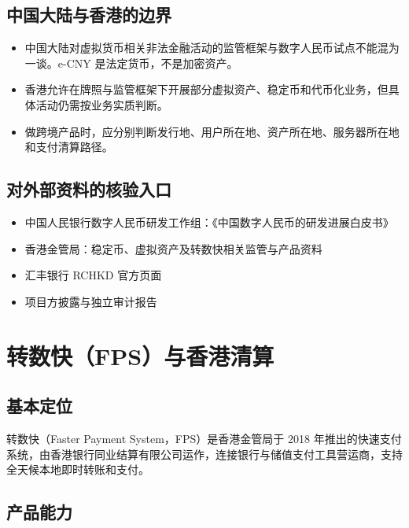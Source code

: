 \section{中国大陆与香港的边界}\label{ux4e2dux56fdux5927ux9646ux4e0eux9999ux6e2fux7684ux8fb9ux754c}

\begin{itemize}
\tightlist
\item
  中国大陆对虚拟货币相关非法金融活动的监管框架与数字人民币试点不能混为一谈。e-CNY
  是法定货币，不是加密资产。
\item
  香港允许在牌照与监管框架下开展部分虚拟资产、稳定币和代币化业务，但具体活动仍需按业务实质判断。
\item
  做跨境产品时，应分别判断发行地、用户所在地、资产所在地、服务器所在地和支付清算路径。
\end{itemize}

\section{对外部资料的核验入口}\label{ux5bf9ux5916ux90e8ux8d44ux6599ux7684ux6838ux9a8cux5165ux53e3}

\begin{itemize}
\tightlist
\item
  中国人民银行数字人民币研发工作组：《中国数字人民币的研发进展白皮书》
\item
  香港金管局：稳定币、虚拟资产及转数快相关监管与产品资料
\item
  汇丰银行 RCHKD 官方页面
\item
  项目方披露与独立审计报告
\end{itemize}

\chapter{转数快（FPS）与香港清算}\label{ux8f6cux6570ux5febfpsux4e0eux9999ux6e2fux6e05ux7b97}

\section{基本定位}\label{ux57faux672cux5b9aux4f4d}

转数快（Faster Payment System，FPS）是香港金管局于 2018
年推出的快速支付系统，由香港银行同业结算有限公司运作，连接银行与储值支付工具营运商，支持全天候本地即时转账和支付。

\section{产品能力}\label{ux4ea7ux54c1ux80fdux529b}

